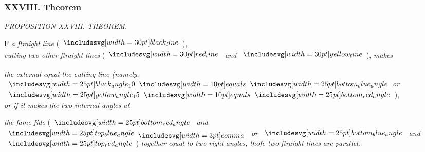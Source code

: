 \documentclass[11pt,preview]{standalone}
\begin{document}
\subsubsection{XXVIII. Theorem}

\begin{minipage}[t]{0.54\textwidth}
    \begin{center}
        \textit{PROPOSITION XXVIII. THEOREM.}\label{book1pr28} \\
    \end{center}

    \hfill

    \begin{center}
        \raggedright \lettrine[lines=3, loversize=1, nindent=0pt]{}{}F \textit{a ſtraight line} (\hspace{-1ex}$\blackline$\hspace{-1ex}),\\ \textit{cutting two other ſtraight lines} (\hspace{-1ex}$\redline$ \textit{and} $\yellowline$\hspace{-1ex}), \textit{makes}
    \end{center}
    \textit{the external equal the cutting line (namely},\\ $\img{black_angle_10} \hspace{-1ex}\bequals \hspace{-1ex}\img{bottom_blue_angle}$\textit{or} $\img{yellow_angle_15} \hspace{-1ex}\bequals \hspace{-1ex}\img{bottom_red_angle}$\hspace{-1ex}),\\ \textit{or if it makes the two internal angles at}
\end{minipage}%
\hfill
\begin{minipage}[t]{0.43\textwidth}
    \vspace{20pt}
    
\end{minipage}

\textit{the ſame ſide} (\hspace{-1ex}$\img{bottom_red_angle}$ \textit{and} $\img{top_blue_angle} \bcomma$ \textit{or} $\img{bottom_blue_angle}$ \textit{and} $\img{top_red_angle}$\hspace{-1ex}) \textit{together equal to two right angles, thoſe two ſtraight lines are parallel}.

\hfill
\end{document}
